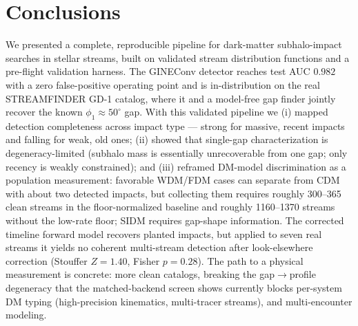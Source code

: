 \documentclass[fleqn,usenatbib]{mnras}
\begin{document}
\section{Conclusions}
We presented a complete, reproducible pipeline for dark-matter subhalo-impact searches
in stellar streams, built on validated stream distribution functions and a pre-flight
validation harness. The GINEConv detector reaches test AUC $0.982$ with a zero
false-positive operating point and is in-distribution on the real STREAMFINDER GD-1
catalog, where it and a model-free gap finder jointly recover the known
$\phi_1\approx50^\circ$ gap. With this validated pipeline we (i) mapped detection
completeness across impact type --- strong for massive, recent impacts and falling for
weak, old ones; (ii) showed that single-gap characterization is degeneracy-limited
(subhalo mass is essentially unrecoverable from one gap; only recency is weakly
constrained); and (iii) reframed DM-model discrimination as a population measurement:
favorable WDM/FDM cases can separate from CDM with about two detected impacts, but
collecting them requires roughly 300--365 clean streams in the floor-normalized baseline
and roughly 1160--1370 streams without the low-rate floor; SIDM requires gap-shape
information. The corrected timeline forward model recovers planted
impacts, but applied to seven real streams it yields no coherent multi-stream detection
after look-elsewhere correction (Stouffer $Z=1.40$, Fisher $p=0.28$). The path to a
physical measurement is concrete: more clean catalogs, breaking the
gap$\rightarrow$profile degeneracy that the matched-backend screen shows currently blocks
per-system DM typing (high-precision kinematics, multi-tracer streams), and
multi-encounter modeling.
\end{document}
